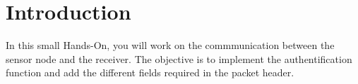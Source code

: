 \section*{Introduction}

In this small Hands-On, you will work on the commmunication between the sensor node
and the receiver. The objective is to implement the authentification function and add the different fields required in the packet header.